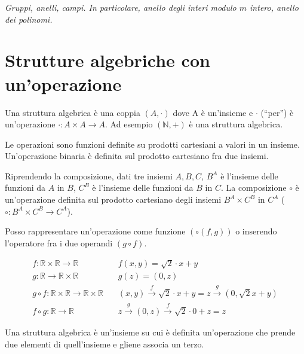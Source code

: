 
\begin{center}
\indent
\textit{Gruppi, anelli, campi. In particolare, anello degli interi modulo $m$ intero, anello dei polinomi.}
\end{center}

\section{Strutture algebriche con un'operazione}

Una struttura algebrica \`e una coppia $(A, \cdot)$ dove A \`e un'insieme e $\cdot$ (``per'') \`e un'operazione $\cdot : A \times A \to A$. Ad esempio $(\mathbb{N}, +)$ \`e una struttura algebrica.

Le operazioni sono funzioni definite su prodotti cartesiani a valori in un insieme. Un'operazione binaria \`e definita sul prodotto cartesiano fra due insiemi.

Riprendendo la composizione, dati tre insiemi $A, B, C$, $B^A$ \`e l'insieme delle funzioni da $A$ in $B$, $C^B$ \`e l'insieme delle funzioni da $B$ in $C$. La composizione $\circ$ \`e un'operazione definita sul prodotto cartesiano degli insiemi $B^A \times C^B$ in $C^A$ ($\circ : B^A \times C^B \to C^A$).

Posso rappresentare un'operazione come funzione $(\circ \left( f, g \right))$ o inserendo l'operatore fra i due operandi $ (g \circ f) $.
\begin{exmp}
\begin{align*}
f: \mathbb{R} \times \mathbb{R} \to \mathbb{R}  & \, &
f(x,y) = \sqrt{2} \cdot x + y \\
g: \mathbb{R} \to \mathbb{R} \times \mathbb{R}  & \, &
g(z) = (0,z) \\
g \circ f : \mathbb{R} \times \mathbb{R} \to \mathbb{R} \times \mathbb{R} & \, & 
(x,y) \xrightarrow{f} \sqrt{2} \cdot x + y = z \xrightarrow{g} \left( 0, \sqrt{2}x + y \right) \\
f \circ g : \mathbb{R} \to \mathbb{R} & \, &
z \xrightarrow{g} (0,z) \xrightarrow{f} \sqrt{2} \cdot 0 + z = z
\end{align*}
\end{exmp}

Una struttura algebrica \`e un'insieme su cui \`e definita un'operazione che prende due elementi di quell'insieme e gliene associa un terzo.


